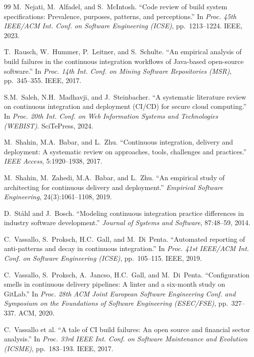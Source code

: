 \documentclass[12pt, a4paper]{article}
\begin{document}
\begin{thebibliography}{99}
M.~Nejati, M.~Alfadel, and S.~McIntosh.
``Code review of build system specifications: Prevalence, purposes, patterns, and
perceptions.''
In \emph{Proc. 45th IEEE/ACM Int. Conf. on Software Engineering (ICSE)},
pp.~1213--1224. IEEE, 2023.

T.~Rausch, W.~Hummer, P.~Leitner, and S.~Schulte.
``An empirical analysis of build failures in the continuous integration workflows of
Java-based open-source software.''
In \emph{Proc. 14th Int. Conf. on Mining Software Repositories (MSR)},
pp.~345--355. IEEE, 2017.

S.M.~Saleh, N.H.~Madhavji, and J.~Steinbacher.
``A systematic literature review on continuous integration and deployment (CI/CD) for
secure cloud computing.''
In \emph{Proc. 20th Int. Conf. on Web Information Systems and Technologies (WEBIST)}.
SciTePress, 2024.

M.~Shahin, M.A.~Babar, and L.~Zhu.
``Continuous integration, delivery and deployment: A systematic review on approaches,
tools, challenges and practices.''
\emph{IEEE Access}, 5:1920--1938, 2017.

M.~Shahin, M.~Zahedi, M.A.~Babar, and L.~Zhu.
``An empirical study of architecting for continuous delivery and deployment.''
\emph{Empirical Software Engineering}, 24(3):1061--1108, 2019.

D.~St{\aa}hl and J.~Bosch.
``Modeling continuous integration practice differences in industry software
development.''
\emph{Journal of Systems and Software}, 87:48--59, 2014.

C.~Vassallo, S.~Proksch, H.C.~Gall, and M.~Di~Penta.
``Automated reporting of anti-patterns and decay in continuous integration.''
In \emph{Proc. 41st IEEE/ACM Int. Conf. on Software Engineering (ICSE)},
pp.~105--115. IEEE, 2019.

C.~Vassallo, S.~Proksch, A.~Jancso, H.C.~Gall, and M.~Di~Penta.
``Configuration smells in continuous delivery pipelines: A linter and a six-month
study on GitLab.''
In \emph{Proc. 28th ACM Joint European Software Engineering Conf. and Symposium on
the Foundations of Software Engineering (ESEC/FSE)}, pp.~327--337. ACM, 2020.

C.~Vassallo et al.
``A tale of CI build failures: An open source and financial sector analysis.''
In \emph{Proc. 33rd IEEE Int. Conf. on Software Maintenance and Evolution (ICSME)},
pp.~183--193. IEEE, 2017.


\end{thebibliography}
\end{document}
